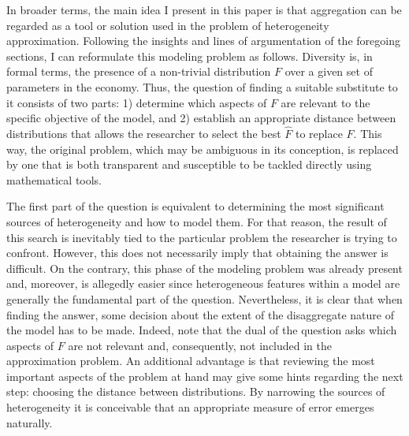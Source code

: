 \documentclass[english, a4paper, 12pt]{article}
\begin{document}
In broader terms, the main idea I present in this paper is that aggregation can be regarded as a tool or solution used in the problem of heterogeneity approximation. Following the insights and lines of argumentation of the foregoing sections, I can reformulate this modeling problem as follows. Diversity is, in formal terms, the presence of a non-trivial distribution $F$ over a given set of parameters in the economy. Thus, the question of finding a suitable substitute to it consists of two parts: 1) determine which aspects of $F$ are relevant to the specific objective of the model, and 2) establish an appropriate distance between distributions that allows the researcher to select the best $\hat{F}$ to replace $F$. This way, the original problem, which may be ambiguous in its conception, is replaced by one that is both transparent and susceptible to be tackled directly using mathematical tools.

The first part of the question is equivalent to determining the most significant sources of heterogeneity and how to model them. For that reason, the result of this search is inevitably tied to the particular problem the researcher is trying to confront. However, this does not necessarily imply that obtaining the answer is difficult. On the contrary, this phase of the modeling problem was already present and, moreover, is allegedly easier since heterogeneous features within a model are generally the fundamental part of the question. Nevertheless, it is clear that when finding the answer, some decision about the extent of the disaggregate nature of the model has to be made. Indeed, note that the dual of the question asks which aspects of $F$ are not relevant and, consequently, not included in the approximation problem. An additional advantage is that reviewing the most important aspects of the problem at hand may give some hints regarding the next step: choosing the distance between distributions. By narrowing the sources of heterogeneity it is conceivable that an appropriate measure of error emerges naturally.
\end{document}
